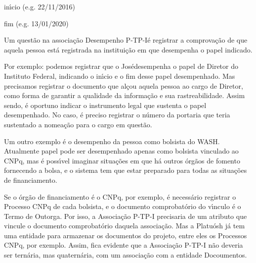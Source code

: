 \documentclass[
12pt,		%
openright,	%
twoside,  %
a4paper,			%
chapter=TITLE,		%
english,			%
french,				%
spanish,			%
brazil				%
]{USPSC-classe/USPSC}
\begin{document}
\begin{alineas}
\item in\'{\i}cio (e.g. 22/11/2016)
\item fim (e.g. 13/01/2020)
\end{alineas}

Um quest\~ao na associa\c{c}\~ao \textquotedbl Desempenho P-TP-I\textquotedbl  \'e registrar a comprova\c{c}\~ao de que aquela pessoa est\'a registrada na institui\c{c}\~ao em que desempenha o papel indicado.














Por exemplo: podemos registrar que o \textquotedbl Jos\'e\textquotedbl  desempenha o papel de Diretor do Instituto Federal, indicando o in\'{\i}cio e o fim desse papel desempenhado. Mas precisamos registrar o documento que al\c{c}ou aquela pessoa ao cargo de Diretor, como forma de garantir a qualidade da informa\c{c}\~ao e sua rastreabilidade. Assim sendo, \'e oportuno indicar o instrumento legal que sustenta o papel desempenhado. No caso, \'e preciso registrar o n\'umero da portaria que teria sustentado a nomea\c{c}\~ao para o cargo em quest\~ao.














Um outro exemplo \'e o desempenho da pessoa como bolsista do WASH. Atualmente papel pode ser desempenhado apenas como bolsista vinculado ao CNPq, mas \'e poss\'{\i}vel imaginar situa\c{c}\~oes em que h\'a outros \'org\~aos de fomento fornecendo a bolsa, e o sistema tem que estar preparado para todas as situa\c{c}\~oes de financiamento.














Se o \'org\~ao de financiamento \'e o CNPq, por exemplo, \'e necess\'ario registrar o Processo CNPq de cada bolsista, e o documento comprobat\'orio do v\'{\i}nculo \'e o Termo de Outorga. Por isso, a Associa\c{c}\~ao P-TP-I precisaria de um atributo que vincule o documento comprobat\'orio daquela associa\c{c}\~ao. Mas a Platu\'osh j\'a tem uma entidade para armazenar os documentos do projeto, entre eles os Processos CNPq, por exemplo. Assim, fica evidente que a Associa\c{c}\~ao P-TP-I n\~ao deveria ser tern\'aria, mas quatern\'aria, com um associa\c{c}\~ao com a entidade \textquotedbl Docoumentos\textquotedbl .
\end{document}
